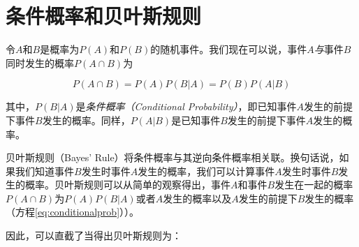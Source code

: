 
\section{条件概率和贝叶斯规则}
\label{sec:bayesrule}
令$A$和$B$是概率为$P(A)$和$P(B)$的随机事件。我们现在可以说，事件$A$\emph{与}事件$B$同时发生的概率$P(A\cap B)$为

\begin{equation}\label{eq:conditionalprob}
P(A \cap B)=P(A)P(B|A)=P(B)P(A|B)
\end{equation}


其中，$P(B|A)$是\emph{条件概率（Conditional Probability）}，即已知事件$A$发生的前提下事件$B$发生的概率。同样，$P(A|B)$是已知事件$B$发生的前提下事件$A$发生的概率。


贝叶斯规则（Bayes' Rule）将条件概率与其逆向条件概率相关联。换句话说，如果我们知道事件$B$发生时事件$A$发生的概率，我们可以计算事件$A$发生时事件$B$发生的概率。贝叶斯规则可以从简单的观察得出，事件$A$和事件$B$发生在一起的概率$P(A\cap B)$为$P(A)P(B|A)$或者$A$发生的概率以及$A$发生的前提下$B$发生的概率（方程\ref{eq:conditionalprob}））。

因此，可以直截了当得出贝叶斯规则为：

